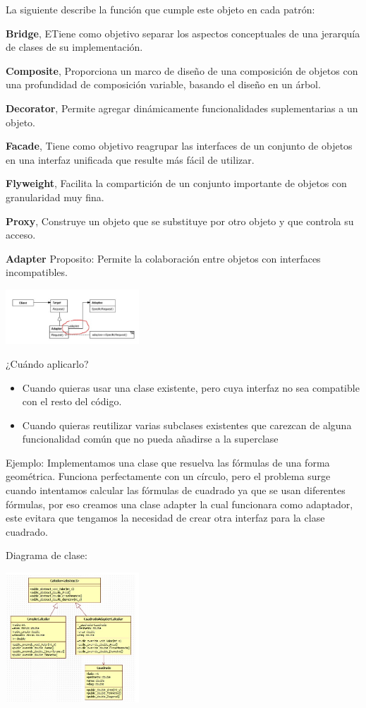 \documentclass{article}
\begin{document}
\begin{multicols}{2}
La siguiente describe la función que cumple este objeto en cada patrón:

\textbf{Bridge}, ETiene como objetivo separar los aspectos conceptuales de una jerarquía de clases de su implementación.


\textbf{Composite}, Proporciona un marco de diseño de una composición de objetos con una profundidad de composición variable, basando el diseño en un árbol.


\textbf{Decorator}, Permite agregar dinámicamente funcionalidades suplementarias a un objeto.


\textbf{Facade}, Tiene como objetivo reagrupar las interfaces de un conjunto de objetos en una interfaz unificada que resulte más fácil de utilizar.


\textbf{Flyweight}, Facilita la compartición de un conjunto importante de objetos con granularidad muy fina.


\textbf{Proxy}, Construye un objeto que se substituye por otro objeto y que controla su acceso.


\textbf{Adapter}
Proposito:
Permite la colaboración entre objetos con interfaces incompatibles.

\includegraphics[width=5cm]{imagen2.jpg}

¿Cuándo aplicarlo?
\begin{itemize}
 \item Cuando quieras usar una clase existente, pero cuya interfaz no sea compatible con el resto del código.
 \item Cuando quieras reutilizar varias subclases existentes que carezcan de alguna funcionalidad común que no pueda añadirse a la superclase
\end{itemize}

Ejemplo:
Implementamos una clase que resuelva las fórmulas de una forma geométrica. Funciona perfectamente con un círculo, pero el problema surge cuando intentamos calcular las fórmulas de cuadrado ya que se usan diferentes fórmulas, por eso creamos una clase adapter la cual funcionara como adaptador, este evitara que tengamos la necesidad de crear otra interfaz para la clase cuadrado.

Diagrama de clase:

\includegraphics[width=5cm]{imagen3.jpg}


\end{multicols}
\end{document}
